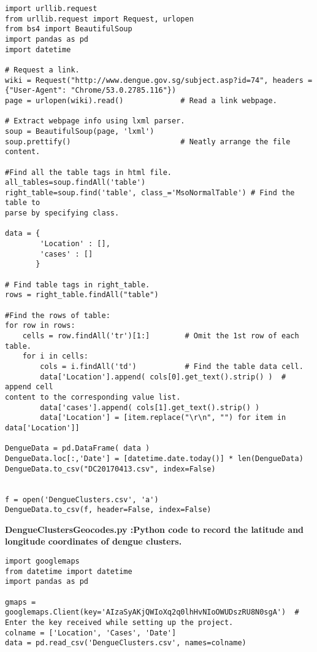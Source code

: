 \documentclass[11pt]{exam}
\begin{document}
\begin{questions}
\begin{lstlisting}
import urllib.request
from urllib.request import Request, urlopen
from bs4 import BeautifulSoup
import pandas as pd
import datetime

# Request a link.
wiki = Request("http://www.dengue.gov.sg/subject.asp?id=74", headers = {"User-Agent": "Chrome/53.0.2785.116"})
page = urlopen(wiki).read()             # Read a link webpage.
 
# Extract webpage info using lxml parser.
soup = BeautifulSoup(page, 'lxml')
soup.prettify()                         # Neatly arrange the file content.

#Find all the table tags in html file.
all_tables=soup.findAll('table')
right_table=soup.find('table', class_='MsoNormalTable') # Find the table to 
parse by specifying class.

data = {
        'Location' : [],
        'cases' : []
       }

# Find table tags in right_table.
rows = right_table.findAll("table")

#Find the rows of table:
for row in rows:
    cells = row.findAll('tr')[1:]        # Omit the 1st row of each table.
    for i in cells:
        cols = i.findAll('td')           # Find the table data cell.
        data['Location'].append( cols[0].get_text().strip() )  # append cell
content to the corresponding value list.
        data['cases'].append( cols[1].get_text().strip() )
        data['Location'] = [item.replace("\r\n", "") for item in data['Location']]
        
DengueData = pd.DataFrame( data )
DengueData.loc[:,'Date'] = [datetime.date.today()] * len(DengueData)
DengueData.to_csv("DC20170413.csv", index=False)


f = open('DengueClusters.csv', 'a')
DengueData.to_csv(f, header=False, index=False)

\end{lstlisting}

\newpage
\color{black}
\textbf{DengueClustersGeocodes.py :Python code to record the latitude and longitude coordinates of dengue clusters.}
\color{Magenta}
\begin{lstlisting}
import googlemaps
from datetime import datetime
import pandas as pd

gmaps = googlemaps.Client(key='AIzaSyAKjQWIoXq2q0lhHvNIoOWUDszRU8N0sgA')  # Enter the key received while setting up the project.
colname = ['Location', 'Cases', 'Date']
data = pd.read_csv('DengueClusters.csv', names=colname)


\end{lstlisting}
\end{questions}
\end{document}
